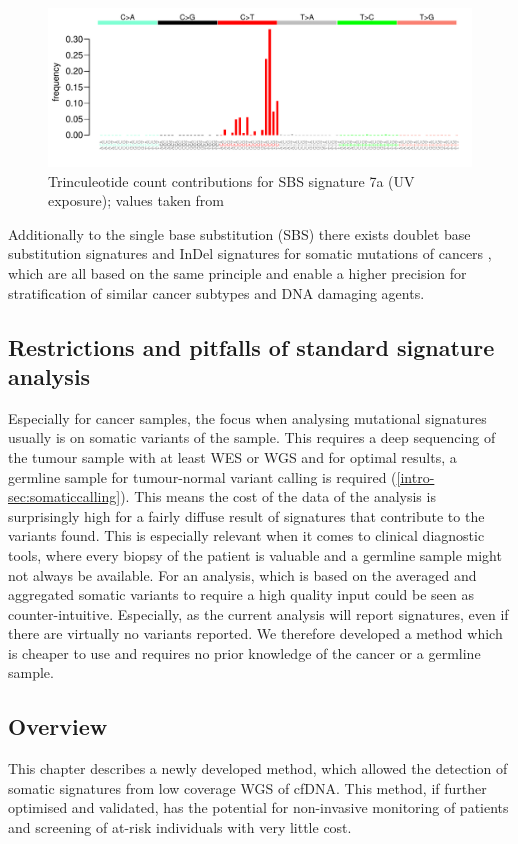 \begin{figure}[!ht]
\centering
\includegraphics[width=.99\linewidth]{Figures/MisMatchFinder/SBS7aSignature.pdf}
\caption[Trinculeotide count contributions for single base substitution (SBS) signature 7a]{Trinculeotide count contributions for SBS signature 7a (UV exposure); values taken from \protect\textcite{Alexandrov2020}}\label{fig:sig7a}
\end{figure}

Additionally to the single base substitution (SBS) there exists doublet base substitution signatures and InDel signatures for somatic mutations of cancers \cite{Alexandrov2020}, which are all based on the same principle and enable a higher precision for stratification of similar cancer subtypes and DNA damaging agents.

\subsection{Restrictions and pitfalls of standard signature analysis}
Especially for cancer samples, the focus when analysing mutational signatures usually is on somatic variants of the sample. This requires a deep sequencing of the tumour sample with at least WES or WGS and for optimal results, a germline sample for tumour-normal variant calling is required (\autoref{intro-sec:somaticcalling}). This means the cost of the data of the analysis is surprisingly high for a fairly diffuse result of signatures that contribute to the variants found. This is especially relevant when it comes to clinical diagnostic tools, where every biopsy of the patient is valuable and a germline sample might not always be available. For an analysis, which is based on the averaged and aggregated somatic variants to require a high quality input could be seen as counter-intuitive. Especially, as the current analysis will report signatures, even if there are virtually no variants reported. We therefore developed a method which is cheaper to use and requires no prior knowledge of the cancer or a germline sample.

\subsection{Overview}
 This chapter describes a newly developed method, which allowed the detection of somatic signatures from low coverage WGS of cfDNA. This method, if further optimised and validated, has the potential for non-invasive monitoring of patients and  screening of at-risk individuals with very little cost.
